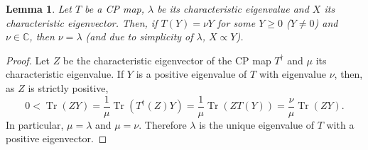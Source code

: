 \documentclass{article}
\newtheorem{lemma}{Lemma}
\newcommand{\tr}{\operatorname{Tr}}
\begin{document}
\begin{lemma}
  Let $T$ be a CP map, $\lambda$ be its characteristic eigenvalue and $X$ its characteristic eigenvector. Then, if $T(Y) = \nu Y$ for some $Y\geq 0$ ($Y\neq 0$) and $\nu\in \mathbb{C}$, then $\nu = \lambda$ (and due to simplicity of $\lambda$, $X\propto Y$).
\end{lemma}

\begin{proof}
   Let $Z$ be the characteristic eigenvector of  the CP map $T^\dagger$ and $\mu$ its characteristic eigenvalue. If $Y$ is a positive eigenvalue of $T$ with eigenvalue $\nu$, then, as $Z$ is strictly positive,
  \begin{equation*}
    0< \tr(ZY) = \frac{1}{\mu} \tr(T^\dagger(Z)Y) = \frac{1}{\mu} \tr(Z T(Y)) = \frac{\nu}{\mu} \tr(ZY).
  \end{equation*}
  In particular, $\mu = \lambda$ and $\mu=\nu$. Therefore $\lambda$ is the unique eigenvalue of $T$ with a positive eigenvector.
\end{proof}
\end{document}

